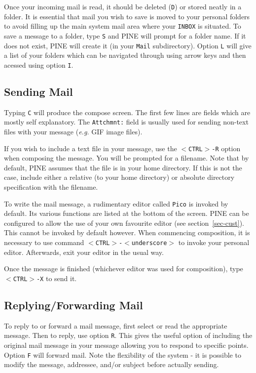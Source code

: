 \documentclass[11pt,nolof]{starlink}
\begin{document}
Once your incoming mail is read, it should be deleted (\texttt{D}) or
stored neatly in a folder. It is essential that mail you wish to save
is moved to your personal folders to avoid filling up the main system
mail area where your \texttt{INBOX} is situated.  To save a message to a
folder, type \texttt{S} and PINE will prompt for a folder name. If it does
not exist, PINE will create it (in your \texttt{Mail} subdirectory).
Option \texttt{L} will give a list of your folders which can be navigated
through using arrow keys and then acessed using option \texttt{I}.

\subsection{Sending Mail}

Typing \texttt{C} will produce the compose screen. The first few lines are
fields which are mostly self explanatory. The \texttt{Attchmnt:} field is
usually used for sending non-text files with your message (\emph{e.g.}
GIF image files).

If you wish to include a text file in your message, use the \texttt{$<$CTRL$>$-R} option when composing the message. You will be prompted
for a filename.  Note that by default, PINE assumes that the file is in
your home directory. If this is not the case, include either a relative
(to your home directory) or absolute directory specification with the
filename.

To write the mail message, a rudimentary editor called \texttt{Pico} is
invoked by default.  Its various functions are listed at the bottom of
the screen.  PINE can be configured to allow the use of your own
favourite editor (see section~\ref{sec-cust}). This cannot be invoked
by default however.  When commencing composition, it is necessary to
use command \texttt{$<$CTRL$>$-$<$underscore$>$} to invoke your personal
editor.  Afterwards, exit your editor in the usual way.

Once the message is finished (whichever editor was used for composition),
type  \texttt{$<$CTRL$>$-X} to send it.

\subsection{Replying/Forwarding Mail}

To reply to or forward a mail message, first select or read the
appropriate message. Then to reply, use option \texttt{R}.  This gives the
useful option of including the original mail message in your message
allowing you to respond to specific points. Option \texttt{F} will forward
mail. Note the flexibility of the system - it is possible to modify the
message, addressee, and/or subject before actually sending.
\end{document}
